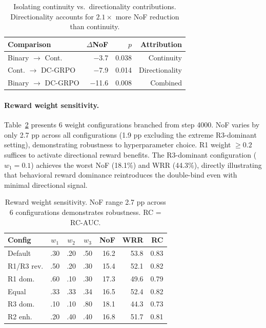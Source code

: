 \documentclass[11pt,a4paper]{article}
\begin{document}
\begin{table}[t]
\centering
\small
\begin{tabular}{lrrr}
\toprule
\textbf{Comparison} & \textbf{$\Delta$NoF} & \textbf{$p$} & \textbf{Attribution} \\
\midrule
Binary $\to$ Cont. & $-$3.7 & 0.038 & Continuity \\
Cont. $\to$ DC-GRPO & $-$7.9 & 0.014 & Directionality \\
Binary $\to$ DC-GRPO & $-$11.6 & 0.008 & Combined \\
\bottomrule
\end{tabular}
\caption{Isolating continuity vs.\ directionality contributions. Directionality accounts for $2.1\times$ more NoF reduction than continuity.}
\label{tab:continuity_vs_direction}
\end{table}

\paragraph{Reward weight sensitivity.}
Table~\ref{tab:weight_sensitivity} presents 6 weight configurations branched from step 4000. NoF varies by only 2.7 pp across all configurations (1.9 pp excluding the extreme R3-dominant setting), demonstrating robustness to hyperparameter choice. R1 weight $\geq 0.2$ suffices to activate directional reward benefits. The R3-dominant configuration ($w_1 = 0.1$) achieves the worst NoF (18.1\%) and WRR (44.3\%), directly illustrating that behavioral reward dominance reintroduces the double-bind even with minimal directional signal.

\begin{table}[t]
\centering
\small
\begin{tabular}{lcccrrr}
\toprule
\textbf{Config} & $w_1$ & $w_2$ & $w_3$ & \textbf{NoF} & \textbf{WRR} & \textbf{RC} \\
\midrule
Default & .30 & .20 & .50 & 16.2 & 53.8 & 0.83 \\
R1/R3 rev. & .50 & .20 & .30 & 15.4 & 52.1 & 0.82 \\
R1 dom. & .60 & .10 & .30 & 17.3 & 49.6 & 0.79 \\
Equal & .33 & .33 & .34 & 16.5 & 52.4 & 0.82 \\
R3 dom. & .10 & .10 & .80 & 18.1 & 44.3 & 0.73 \\
R2 enh. & .20 & .40 & .40 & 16.8 & 51.7 & 0.81 \\
\bottomrule
\end{tabular}
\caption{Reward weight sensitivity. NoF range 2.7 pp across 6 configurations demonstrates robustness. RC = RC-AUC.}
\label{tab:weight_sensitivity}
\end{table}
\end{document}
